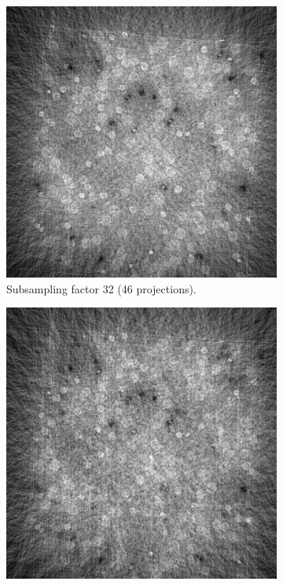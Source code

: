 \begin{figure}
  \medskip

  \begin{subfigure}[t]{.45\textwidth}
    \centering
    \includegraphics[width=\linewidth]{figures/ns32.png}
    \caption{Subsampling factor 32 (46 projections). }
  \end{subfigure}
  \hfill
  \begin{subfigure}[t]{.45\textwidth}
    \centering
    \includegraphics[width=\linewidth]{figures/ns48.png}

\end{subfigure}
\end{figure}
